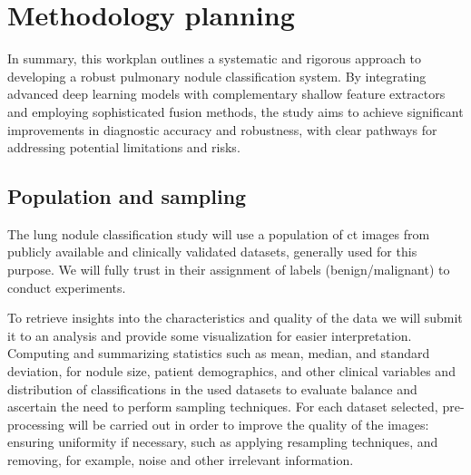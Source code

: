\chapter{Methodology planning }\label{chap:chap4}
In summary, this workplan outlines a systematic and rigorous approach to developing a robust pulmonary nodule classification system. By integrating advanced deep learning models with complementary shallow feature extractors and employing sophisticated fusion methods, the study aims to achieve significant improvements in diagnostic accuracy and robustness, with clear pathways for addressing potential limitations and risks.

    
    
    
    
    
\section{Population and sampling}
    The lung nodule classification study will use a population of \ac{ct} images from publicly available and clinically validated datasets, generally used for this purpose. We will fully trust in their assignment of labels (benign/malignant) to conduct experiments. 
    
    To retrieve insights into the characteristics and quality of the data we will submit it to an analysis and provide some visualization for easier interpretation. Computing and summarizing statistics such as mean, median, and standard deviation, for nodule size, patient demographics, and other clinical variables and distribution of classifications in the used datasets to evaluate balance and ascertain the need to perform sampling techniques. For each dataset selected, pre-processing will be carried out in order to improve the quality of the images: ensuring uniformity if necessary, such as applying resampling techniques, and removing, for example, noise and other irrelevant information.
    
